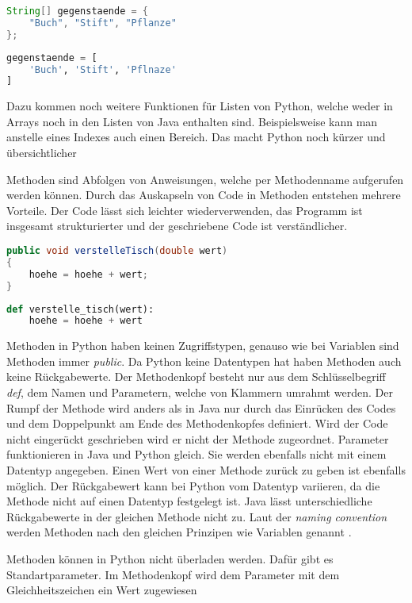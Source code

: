 \begin{lstlisting}[language=java,caption={Einfache Deklarierung eines Arrays in Java},captionpos=b,label={lst:java:ezarray}]
String[] gegenstaende = {
    "Buch", "Stift", "Pflanze"
};
\end{lstlisting}

\begin{lstlisting}[language=python,caption={Einfach Deklarierung eines Arrays in Python},captionpos=b,label={lst:python:ezarray}]
gegenstaende = [
    'Buch', 'Stift', 'Pflnaze'
]
\end{lstlisting}

Dazu kommen noch weitere Funktionen für Listen von Python, welche weder in Arrays noch in den Listen von Java enthalten sind. Beispielsweise kann man anstelle eines Indexes auch einen Bereich. Das macht Python noch kürzer und übersichtlicher\par
Methoden sind Abfolgen von Anweisungen, welche per Methodenname aufgerufen werden können. Durch das Auskapseln von Code in Methoden entstehen mehrere Vorteile. Der Code lässt sich leichter wiederverwenden, das Programm ist insgesamt strukturierter und der geschriebene Code ist verständlicher. \cite{Python3:Buch}\cite{Louis:2010}

\begin{lstlisting}[language=java,caption={Methoden in Java},captionpos=b,label={lst:java:methode}]
public void verstelleTisch(double wert)
{
    hoehe = hoehe + wert;
}
\end{lstlisting}

\begin{lstlisting}[language=python,caption={Methode in Python},captionpos=b,label={lst:python:methode}]
def verstelle_tisch(wert):
    hoehe = hoehe + wert
\end{lstlisting}

Methoden in Python haben keinen Zugriffstypen, genauso wie bei Variablen sind Methoden immer \textit{public}. Da Python keine Datentypen hat haben Methoden auch keine Rückgabewerte. Der Methodenkopf besteht nur aus dem Schlüsselbegriff \textit{def}, dem Namen und Parametern, welche von Klammern umrahmt werden. Der Rumpf der Methode wird anders als in Java nur durch das Einrücken des Codes und dem Doppelpunkt am Ende des Methodenkopfes definiert. Wird der Code nicht eingerückt geschrieben wird er nicht der Methode zugeordnet. Parameter funktionieren in Java und Python gleich. Sie werden ebenfalls nicht mit einem Datentyp angegeben. Einen Wert von einer Methode zurück zu geben ist ebenfalls möglich. Der Rückgabewert kann bei Python vom Datentyp variieren, da die Methode nicht auf einen Datentyp festgelegt ist. Java lässt unterschiedliche Rückgabewerte in der gleichen Methode nicht zu. Laut der \textit{naming convention} werden Methoden nach den gleichen Prinzipen wie Variablen genannt \cite{Ims:h-s}\cite{Microsoft:CapCon}. \cite{Python3:Buch}\cite{Louis:2010}\par
Methoden können in Python nicht überladen werden. Dafür gibt es Standartparameter. Im Methodenkopf wird dem Parameter mit dem Gleichheitszeichen ein Wert zugewiesen


